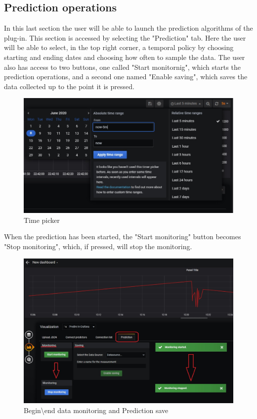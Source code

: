 \subsection{Prediction operations}
In this last section the user will be able to launch the prediction algorithms of the plug-in. This section is accessed by selecting the "Prediction" tab. Here the user will be able to select, in the top right corner, a temporal policy by choosing starting and ending dates and choosing how often to sample the data. The user  also has access to two buttons, one called "Start monitornig", which starts the prediction operations, and a second one named "Enable saving", which saves the data collected up to the point it is pressed.\\

\begin{figure}[H]
\centering
\includegraphics[scale=0.70]{img/plug-in/time_selector.png}
\caption{Time picker}
\end{figure}

When the prediction has been started, the "Start monitoring" button becomes "Stop monitoring", which, if pressed, will stop the monitoring.

\begin{figure}[H]
\centering
\includegraphics[scale=0.65]{img/plug-in/plugin_7.JPG}
\caption{Begin\textbackslash end data monitoring and Prediction save}

\end{figure} 
 

